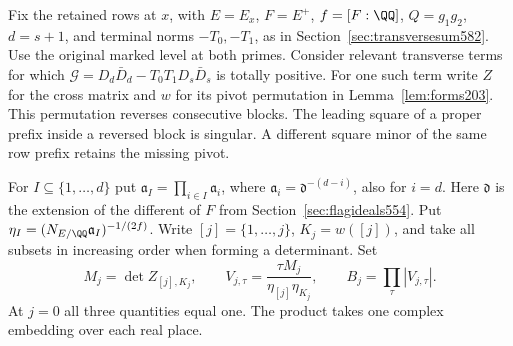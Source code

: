 \documentclass[a4paper,11pt]{article}
\theoremstyle{definition}
\theoremstyle{remark}
\numberwithin{equation}{section}
\begin{document}
Fix the retained rows at \(x\), with \(E=E_x\), \(F=E^+\),
\(f=[F:\QQ]\), \(Q=g_1g_2\), \(d=s+1\), and terminal
norms \(-T_0,-T_1\), as in Section~\ref{sec:transversesum582}.
Use the original marked level at both primes. Consider relevant
transverse terms for which
\(\mathcal G=D_d\bar D_d-T_0T_1D_s\bar D_s\) is totally positive.
For one such term write \(Z\) for the cross matrix and \(w\) for its
pivot permutation in Lemma~\ref{lem:forms203}. This permutation
reverses consecutive blocks. The leading square of a proper prefix
inside a reversed block is singular. A different square minor of
the same row prefix retains the missing pivot.

For \(I\subseteq\{1,\ldots,d\}\) put
\(\mathfrak a_I=\prod_{i\in I}\mathfrak a_i\), where
\(\mathfrak a_i=\mathfrak d^{-(d-i)}\), also for \(i=d\).
Here \(\mathfrak d\) is the extension of the different of \(F\)
from Section~\ref{sec:flagideals554}. Put
\(\eta_I=(N_{E/\QQ}\mathfrak a_I)^{-1/(2f)}\). Write
\([j]=\{1,\ldots,j\}\), \(K_j=w([j])\), and take all subsets in
increasing order when forming a determinant. Set
\[
 M_j=\det Z_{[j],K_j},\qquad
 V_{j,\tau}=\frac{\tau M_j}{\eta_{[j]}\eta_{K_j}},\qquad
 B_j=\prod_{\tau}|V_{j,\tau}|.
\]
At \(j=0\) all three quantities equal one. The product takes one
complex embedding over each real place.
\end{document}
